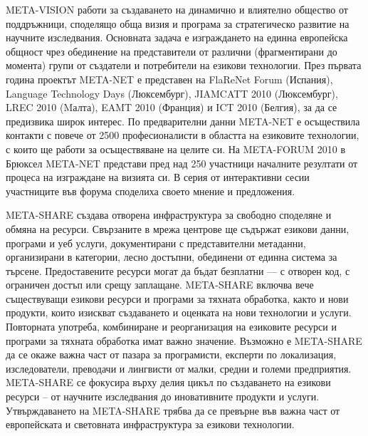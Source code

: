 \begin{multicols}{2}
META-VISION работи за създаването на динамично и влиятелно общество от поддръжници, споделящо обща визия и програма за стратегическо развитие на научните изследвания. Основната задача е изграждането на единна европейска общност чрез обединение на представители от различни (фрагментирани до момента) групи от създатели и потребители на езикови технологии. През първата година проектът META-NET е представен на FlaReNet Forum
 (Испания), Language Technology Days (Люксембург), JIAMCATT 2010 (Люксембург), LREC 2010 (Mалта), EAMT 2010 (Франция) и ICT 2010 (Белгия), за да се предизвика широк интерес.
По предварителни данни META-NET е осъществила контакти с повече от 2500 професионалисти в областта
 на езиковите технологии, с които ще работи за осъществяване на целите си. На META-FORUM 2010 в Брюксел META-NET представи пред над 250 участници началните резултати от процеса на
 изграждане на визията си. В
 серия от интерактивни сесии участниците във форума споделиха своето мнение и предложения.

META-SHARE създава отворена инфраструктура за свободно споделяне и обмяна на ресурси. Свързаните в мрежа центрове ще съдържат езикови данни, програми и уеб услуги, документирани  с представителни метаданни, организирани в категории, лесно достъпни, обединени от единна система  за търсене.
Предоставените ресурси могат да бъдат безплатни — с отворен код, с ограничен достъп или срещу заплащане. META-SHARE включва вече съществуващи езикови ресурси и програми за тяхната обработка, както и нови продукти, които изискват създаването и оценката на нови технологии и услуги.  
Повторната употреба, комбиниране и реорганизация на езиковите ресурси и програми за тяхната обработка имат важно значение. Възможно е META-SHARE да се окаже важна част от пазара за програмисти, експерти по
 локализация, изследователи, преводачи и лингвисти от малки, средни и големи предприятия. META-SHARE се фокусира върху делия цикъл по създаването на езикови ресурси –
 от научните изследвания до иновативните продукти и услуги. Утвърждаването на META-SHARE трябва да се превърне във важна част от европейската и световната инфраструктура за езикови технологии.


\end{multicols}
